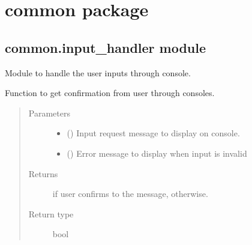 \documentclass[letterpaper,10pt,english,openany,oneside]{sphinxmanual}
\begin{document}
\chapter{common package}
\label{\detokenize{docs/source/common:common-package}}\label{\detokenize{docs/source/common::doc}}

\section{common.input\_handler module}
\label{\detokenize{docs/source/common:module-common.input_handler}}\label{\detokenize{docs/source/common:common-input-handler-module}}
Module to handle the user inputs through console.

\begin{fulllineitems}
\label{\detokenize{docs/source/common:common.input_handler.get_confirmation}}
Function to get confirmation from user through consoles.
\begin{quote}\begin{description}
\item[{Parameters}] \leavevmode\begin{itemize}
\item {} 
 () \textendash{} Input request message to display on console.

\item {} 
 () \textendash{} Error message to display when input is invalid

\end{itemize}

\item[{Returns}] \leavevmode
{} if user confirms to the message,  otherwise.

\item[{Return type}] \leavevmode
bool

\end{description}\end{quote}

\end{fulllineitems}
\end{document}
